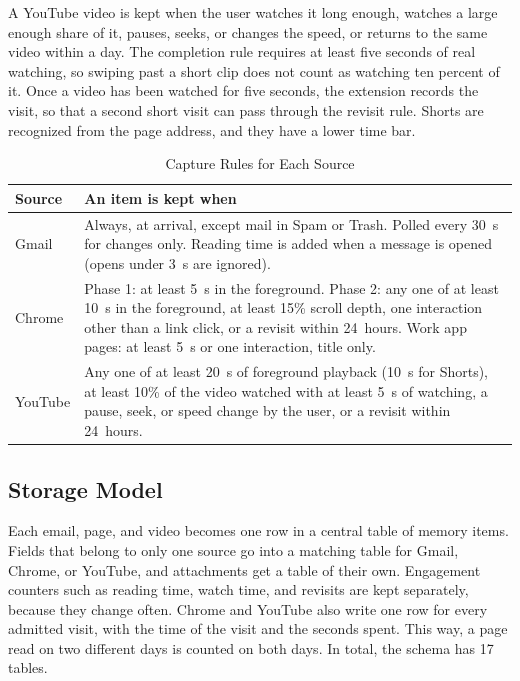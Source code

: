 \documentclass[conference]{IEEEtran}
\begin{document}
A YouTube video is kept when the user watches it long enough, watches a large enough share of it, pauses, seeks, or changes the speed, or returns to the same video within a day. The completion rule requires at least five seconds of real watching, so swiping past a short clip does not count as watching ten percent of it. Once a video has been watched for five seconds, the extension records the visit, so that a second short visit can pass through the revisit rule. Shorts are recognized from the page address, and they have a lower time bar.

\begin{table}[t]
\caption{Capture Rules for Each Source}
\label{tab:gates}
\centering
\renewcommand{\arraystretch}{1.15}
\begin{tabular}{|>{\raggedright\arraybackslash}p{1.35cm}|>{\raggedright\arraybackslash}p{6.2cm}|}
\hline
\textbf{Source} & \textbf{An item is kept when} \\
\hline
Gmail & Always, at arrival, except mail in Spam or Trash. Polled every 30~s for changes only. Reading time is added when a message is opened (opens under 3~s are ignored). \\
\hline
Chrome & Phase 1: at least 5~s in the foreground. Phase 2: any one of at least 10~s in the foreground, at least 15\% scroll depth, one interaction other than a link click, or a revisit within 24~hours. Work app pages: at least 5~s or one interaction, title only. \\
\hline
YouTube & Any one of at least 20~s of foreground playback (10~s for Shorts), at least 10\% of the video watched with at least 5~s of watching, a pause, seek, or speed change by the user, or a revisit within 24~hours. \\
\hline
\end{tabular}
\end{table}

\subsection{Storage Model}
Each email, page, and video becomes one row in a central table of memory items. Fields that belong to only one source go into a matching table for Gmail, Chrome, or YouTube, and attachments get a table of their own. Engagement counters such as reading time, watch time, and revisits are kept separately, because they change often. Chrome and YouTube also write one row for every admitted visit, with the time of the visit and the seconds spent. This way, a page read on two different days is counted on both days. In total, the schema has 17 tables.
\end{document}
